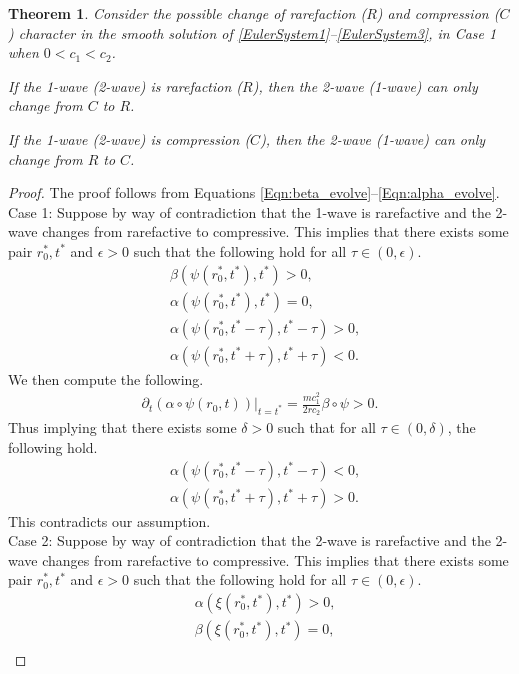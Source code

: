 \documentclass[11pt]{article}
\newtheorem{thm}{Theorem}[section]
\begin{document}
\begin{thm}
	Consider the possible change of rarefaction ($R$) and compression ($C$) character in the smooth solution of \eqref{EulerSystem1}--\eqref{EulerSystem3}, in Case 1 when $0<c_1<c_2$.
	
	If the 1-wave (2-wave) is rarefaction ($R$), then the 2-wave  (1-wave) can only change from $C$ to $R$.
	
	If the 1-wave (2-wave) is compression ($C$), then the 2-wave  (1-wave) can only change from $R$ to $C$.
	\label{thm:inward_wave_supersonic}
\end{thm} 

\begin{proof}
The proof follows from Equations \eqref{Eqn:beta_evolve}--\eqref{Eqn:alpha_evolve}. 
\\
Case 1: Suppose by way of contradiction that the 1-wave is rarefactive and the 2-wave changes from rarefactive to compressive. This implies that there exists some pair $r_0^*,t^*$ and $\epsilon>0$ such that the following hold for all $\tau \in (0,\epsilon)$. 
\begin{align}
	&\beta(\psi(r_0^*,t^*),t^*) > 0, 
	\\
	&\alpha(\psi(r_0^*,t^*),t^*)=0, 
	\\
	&\alpha(\psi(r_0^*,t^*-\tau),t^*-\tau) > 0, 
	\\
	&\alpha(\psi(r_0^*,t^*+\tau),t^*+\tau) < 0.
\end{align} 
We then compute the following. 
\begin{align}
	\partial_t(\alpha\circ\psi(r_0,t))|_{t=t^*} = \frac{mc_1^2}{2rc_2}\beta\circ\psi > 0. 
\end{align} 
Thus implying that there exists some $\delta>0$ such that for all $\tau\in(0,\delta)$, the following hold. 
\begin{align}
	&\alpha(\psi(r_0^*,t^*-\tau),t^*-\tau) < 0, 
	\\
	&\alpha(\psi(r_0^*,t^*+\tau),t^*+\tau) > 0. 
\end{align} 
This contradicts our assumption. 
\bigskip
\\
Case 2: Suppose by way of contradiction that the 2-wave is rarefactive and the 2-wave changes from rarefactive to compressive. This implies that there exists some pair $r_0^*,t^*$ and $\epsilon>0$ such that the following hold for all $\tau \in (0,\epsilon)$. 
\begin{align}
	&\alpha(\xi(r_0^*,t^*),t^*) > 0, 
	\\
	&\beta(\xi(r_0^*,t^*),t^*)=0, 
	\\

\end{align}
\end{proof}
\end{document}
